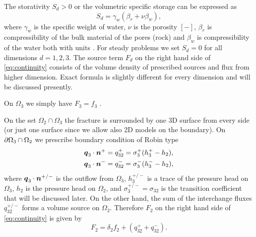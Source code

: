 The storativity $S_d>0$ or the volumetric specific storage can be expressed as
\begin{equation}
  S_d = \gamma_w(\beta_r + \nu \beta_w),
\end{equation}
where $\gamma_w$  is the specific weight of water, $\nu$ is the porosity $[-]$, $\beta_r$ is compressibility of the bulk material of the pores (rock)
and $\beta_w$ is compressibility of the water both with units . For steady problems we set $S_d=0$ for all dimensions $d=1,2,3$.
The source term $F_d$ on the right hand side of \eqref{eq:continuity} consists of the volume density of prescribed sources 
  and flux from higher dimension. 
Exact formula is slightly different for every dimension and will be discussed presently.

On $\Omega_3$ we simply have $F_3  = f_3$ .

On the set $\Omega_2 \cap \Omega_3$ the fracture is surrounded by one 3D surface from every side (or just one surface since we allow also 2D models on the boundary).
On $\partial\Omega_3 \cap \Omega_2$ we prescribe boundary condition of Robin type
\begin{align*}
        \mathbf{\boldsymbol{q}}_3\cdot \mathbf{\boldsymbol{n}}^{+} &= q_{32}^{+} =\sigma_{3}^{+} (h_3^{+}-h_2),\\
        \mathbf{\boldsymbol{q}}_3\cdot \mathbf{\boldsymbol{n}}^{-} &= q_{32}^{-} =\sigma_{3}^{-} (h_3^{-}-h_2),
\end{align*}
where $\mathbf{\boldsymbol{q}}_3\cdot\mathbf{\boldsymbol{n}}^{+/-}$  is the outflow from $\Omega_3$, $h_3^{+/-}$ is
a trace of the pressure head on $\Omega_3$, $h_2$ is the pressure head on $\Omega_2$, and 
$\sigma_{3}^{+/-}=\sigma_{32}$  is the transition coefficient that will be discussed later. 
On the other hand, the sum of the interchange fluxes $q_{32}^{+/-}$ forms
a volume source on $\Omega_2$.  Therefore $F_2$  on the right hand side of \eqref{eq:continuity} is
given by
\begin{equation}
   \label{source_2D}
   F_2 = \delta_2 f_2 + (q_{32}^{+} + q_{32}^{-}).
\end{equation}

